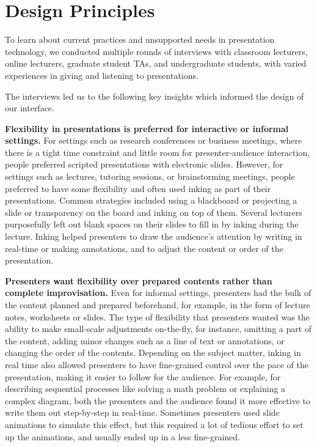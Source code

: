 \section{Design Principles}
To learn about current practices and unsupported needs in presentation technology, we conducted multiple rounds of interviews with classroom lecturers, online lecturers, graduate student TAs, and undergraduate students, with varied experiences in giving and listening to presentations. 

The interviews led us to the following key insights which informed the design of our interface.

\textbf{Flexibility in presentations is preferred for interactive or informal settings.} For settings such as research conferences or business meetings, where there is a tight time constraint and little room for presenter-audience interaction, people preferred scripted presentations with electronic slides. However, for settings such as lectures, tutoring sessions, or brainstorming meetings, people preferred to have some flexibility and often used inking as part of their presentations. Common strategies included using a blackboard or projecting a slide or transparency on the board and inking on top of them. Several lecturers purposefully left out blank spaces on their slides to fill in by inking during the lecture. Inking helped presenters to draw the audience's attention by  writing in real-time or making annotations, and to adjust the content or order of the presentation. 

\textbf{Presenters want flexibility over prepared contents rather than complete improvisation.} Even for informal settings, presenters had the bulk of the content planned and prepared beforehand, for example, in the form of lecture notes, worksheets or slides. The type of flexibility that presenters wanted was the ability to make small-scale adjustments on-the-fly, for instance, omitting a part of the content, adding minor changes such as a line of text or annotations, or changing the order of the contents. Depending on the subject matter, inking in real time also allowed presenters to have fine-grained control over the pace of the presentation, making it easier to follow for the audience. For example, for describing sequential processes like solving a math problem or explaining a complex diagram, both the presenters and the audience found it more effective to write them out step-by-step in real-time. Sometimes presenters used slide animations to simulate this effect, but this required a lot of tedious effort to set up the animations, and usually ended up in a less fine-grained.

